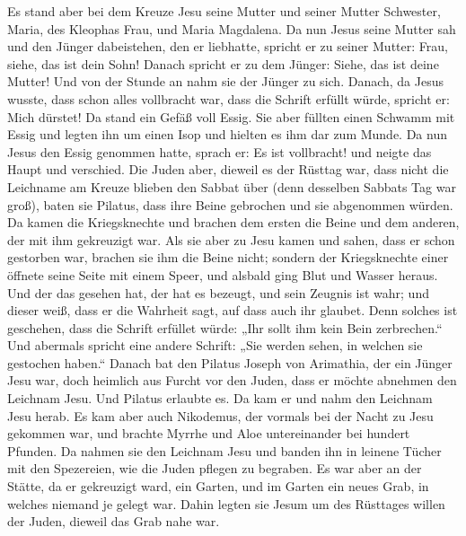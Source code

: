  Es stand aber bei dem Kreuze Jesu seine Mutter und
seiner Mutter Schwester, Maria, des Kleophas Frau, und Maria Magdalena.
 Da nun Jesus seine Mutter sah und den Jünger
dabeistehen, den er liebhatte, spricht er zu seiner Mutter: Frau, siehe,
das ist dein Sohn!  Danach spricht er zu dem Jünger:
Siehe, das ist deine Mutter! Und von der Stunde an nahm sie der Jünger
zu sich.  Danach, da Jesus wusste, dass schon alles
vollbracht war, dass die Schrift erfüllt würde, spricht er: Mich
dürstet!  Da stand ein Gefäß voll Essig. Sie aber füllten
einen Schwamm mit Essig und legten ihn um einen Isop und hielten es ihm
dar zum Munde.  Da nun Jesus den Essig genommen hatte,
sprach er: Es ist vollbracht! und neigte das Haupt und verschied.
 Die Juden aber, dieweil es der Rüsttag war, dass nicht
die Leichname am Kreuze blieben den Sabbat über (denn desselben Sabbats
Tag war groß), baten sie Pilatus, dass ihre Beine gebrochen und sie
abgenommen würden.  Da kamen die Kriegsknechte und
brachen dem ersten die Beine und dem anderen, der mit ihm gekreuzigt
war.  Als sie aber zu Jesu kamen und sahen, dass er schon
gestorben war, brachen sie ihm die Beine nicht;  sondern
der Kriegsknechte einer öffnete seine Seite mit einem Speer, und alsbald
ging Blut und Wasser heraus.  Und der das gesehen hat,
der hat es bezeugt, und sein Zeugnis ist wahr; und dieser weiß, dass er
die Wahrheit sagt, auf dass auch ihr glaubet.  Denn
solches ist geschehen, dass die Schrift erfüllet würde: „Ihr sollt ihm
kein Bein zerbrechen.``  Und abermals spricht eine andere
Schrift: „Sie werden sehen, in welchen sie gestochen haben.``
 Danach bat den Pilatus Joseph von Arimathia, der ein
Jünger Jesu war, doch heimlich aus Furcht vor den Juden, dass er möchte
abnehmen den Leichnam Jesu. Und Pilatus erlaubte es. Da kam er und nahm
den Leichnam Jesu herab.  Es kam aber auch Nikodemus, der
vormals bei der Nacht zu Jesu gekommen war, und brachte Myrrhe und Aloe
untereinander bei hundert Pfunden.  Da nahmen sie den
Leichnam Jesu und banden ihn in leinene Tücher mit den Spezereien, wie
die Juden pflegen zu begraben.  Es war aber an der
Stätte, da er gekreuzigt ward, ein Garten, und im Garten ein neues Grab,
in welches niemand je gelegt war.  Dahin legten sie Jesum
um des Rüsttages willen der Juden, dieweil das Grab nahe war.

